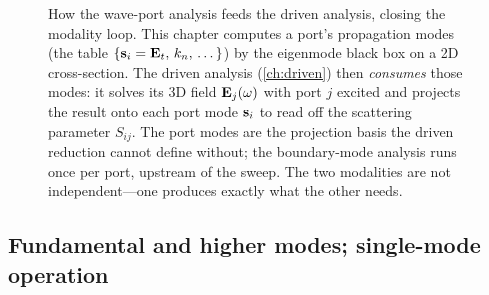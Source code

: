 \begin{figure}[t]
\centering
{}
\caption[Closing the modality loop]{How the wave-port analysis feeds the driven
analysis, closing the modality loop. This chapter computes a port's propagation
modes (the table $\{\mathbf{s}_i=\mathbf{E}_t,\,k_n,\,\dots\}$) by the eigenmode black box on a 2D
cross-section. The driven analysis (\cref{ch:driven}) then \emph{consumes} those
modes: it solves its 3D field $\mathbf{E}_j(\omega)$ with port $j$ excited and projects
the result onto each port mode $\mathbf{s}_i$ to read off the scattering parameter
$S_{ij}$. The port modes are the projection basis the driven reduction cannot
define without; the boundary-mode analysis runs once per port, upstream of the
sweep. The two modalities are not independent---one produces exactly what the other
needs.}
\label{fig:loop-close}
\end{figure}

\subsection{Fundamental and higher modes; single-mode operation}

